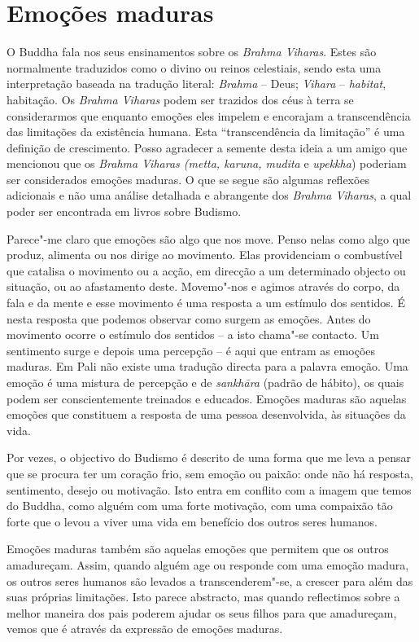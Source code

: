 \chapter{Emoções maduras}

O Buddha fala nos seus ensinamentos sobre os \emph{Brahma Viharas}.
Estes são normalmente traduzidos como o divino ou reinos celestiais,
sendo esta uma interpretação baseada na tradução literal: \emph{Brahma}
-- Deus; \emph{Vihara} -- \emph{habitat}, habitação. Os \emph{Brahma
Viharas} podem ser trazidos dos céus à terra se considerarmos que
enquanto emoções eles impelem e encorajam a transcendência das
limitações da existência humana. Esta ``transcendência da limitação'' é
uma definição de crescimento. Posso agradecer a semente desta ideia a um
amigo que mencionou que os \emph{Brahma Viharas (metta, karuna, mudita}
e \emph{upekkha}) poderiam ser considerados emoções maduras. O que se
segue são algumas reflexões adicionais e não uma análise detalhada e
abrangente dos \emph{Brahma Viharas}, a qual poder ser encontrada em
livros sobre Budismo.

Parece"-me claro que emoções são algo que nos move. Penso nelas como algo
que produz, alimenta ou nos dirige ao movimento. Elas providenciam o
combustível que catalisa o movimento ou a acção, em direcção a um
determinado objecto ou situação, ou ao afastamento deste. Movemo"-nos e
agimos através do corpo, da fala e da mente e esse movimento é uma
resposta a um estímulo dos sentidos. É nesta resposta que podemos
observar como surgem as emoções. Antes do movimento ocorre o estímulo
dos sentidos -- a isto chama"-se contacto. Um sentimento surge e depois
uma percepção -- é aqui que entram as emoções maduras. Em Pali não
existe uma tradução directa para a palavra emoção. Uma emoção é uma
mistura de percepção e de \emph{sankhāra} (padrão de hábito), os quais
podem ser conscientemente treinados e educados. Emoções maduras são
aquelas emoções que constituem a resposta de uma pessoa desenvolvida, às
situações da vida.

Por vezes, o objectivo do Budismo é descrito de uma forma que me leva a
pensar que se procura ter um coração frio, sem emoção ou paixão: onde
não há resposta, sentimento, desejo ou motivação. Isto entra em conflito
com a imagem que temos do Buddha, como alguém com uma forte motivação,
com uma compaixão tão forte que o levou a viver uma vida em benefício
dos outros seres humanos.

Emoções maduras também são aquelas emoções que permitem que os outros
amadureçam. Assim, quando alguém age ou responde com uma emoção madura,
os outros seres humanos são levados a transcenderem"-se, a crescer para
além das suas próprias limitações. Isto parece abstracto, mas quando
reflectimos sobre a melhor maneira dos pais poderem ajudar os seus
filhos para que amadureçam, vemos que é através da expressão de emoções
maduras.

